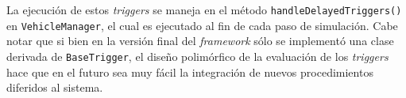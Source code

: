 

La ejecución de estos \emph{triggers} se maneja en el método \texttt{handleDelayedTriggers()} en \texttt{VehicleManager}, el cual es ejecutado al fin de cada paso de simulación. Cabe notar que si bien en la versión final del \emph{framework} sólo se implementó una clase derivada de \texttt{BaseTrigger}, el diseño polimórfico de la evaluación de los \emph{triggers} hace que en el futuro sea muy fácil la integración de nuevos procedimientos diferidos al sistema.


